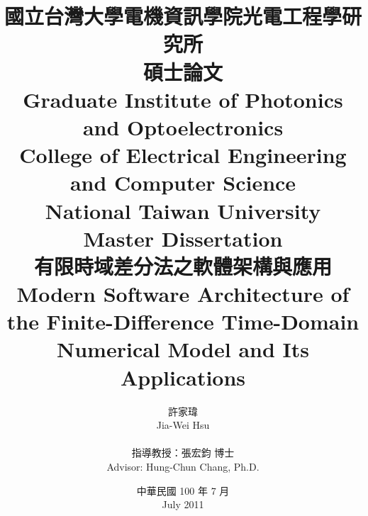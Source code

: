 \title{
  \kai 國立台灣大學電機資訊學院光電工程學研究所\\碩士論文\\
  \rm Graduate Institute of Photonics and Optoelectronics\\College of Electrical Engineering and Computer Science\\National Taiwan University\\Master Dissertation\\[1cm]
  \kai 有限時域差分法之軟體架構與應用\\
  \rm Modern Software Architecture of the Finite-Difference Time-Domain Numerical Model and Its Applications
}

\author{
  \kai 許家瑋\\ \rm Jia-Wei Hsu\\\\
  \kai 指導教授：張宏鈞 博士\\ \rm Advisor: Hung-Chun Chang, Ph.D.
}

\date{
  \kai 中華民國 100 年 7 月\\ 
  \rm July 2011
}

\maketitle
